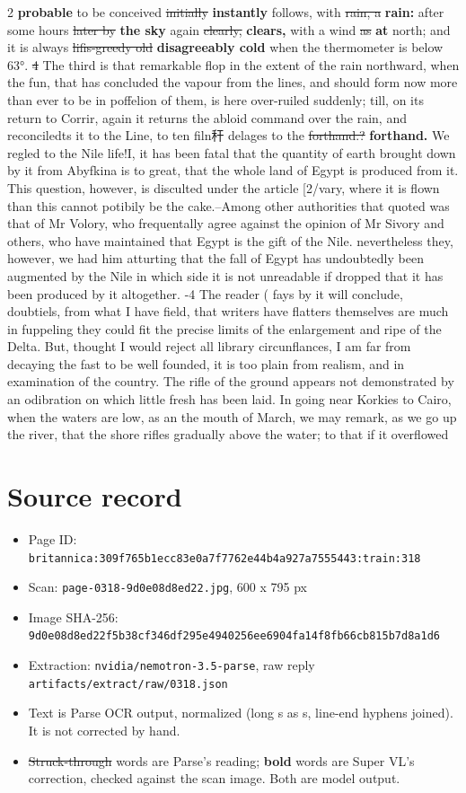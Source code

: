 \documentclass[10pt]{article}
\begin{document}
\begin{multicols}{2}
\textbf{probable} to be conceived \sout{initially} \textbf{instantly} follows, with \sout{rain, a} \textbf{rain:} after some hours \sout{later by} \textbf{the sky} again \sout{clearly,} \textbf{clears,} with a wind \sout{as} \textbf{at} north; and it is always \sout{lifis-greedy old} \textbf{disagreeably cold} when the thermometer is below 63°. \sout{4} The third is that remarkable flop in the extent of the rain northward, when the fun, that has concluded the vapour from the lines, and should form now more than ever to be in poffelion of them, is here over-ruiled suddenly; till, on its return to Corrir, again it returns the abloid command over the rain, and reconciledts it to the Line, to ten filn秆 delages to the \sout{forthand.?} \textbf{forthand.} We regled to the Nile life!I, it has been fatal that the quantity of earth brought down by it from Abyfkina is to great, that the whole land of Egypt is produced from it. This question, however, is disculted under the article [2/vary, where it is flown than this cannot potibily be the cake.--Among other authorities that quoted was that of Mr Volory, who frequentally agree against the opinion of Mr Sivory and others, who have maintained that Egypt is the gift of the Nile. nevertheless they, however, we had him atturting that the fall of Egypt has undoubtedly been augmented by the Nile in which side it is not unreadable if dropped that it has been produced by it altogether. -4 The reader ( fays by it will conclude, doubtiels, from what I have field, that writers have flatters themselves are much in fuppeling they could fit the precise limits of the enlargement and ripe of the Delta. But, thought I would reject all library circunflances, I am far from decaying the fast to be well founded, it is too plain from realism, and in examination of the country. The rifle of the ground appears not demonstrated by an odibration on which little fresh has been laid. In going near Korkies to Cairo, when the waters are low, as an the mouth of March, we may remark, as we go up the river, that the shore rifles gradually above the water; to that if it overflowed
\end{multicols}
\section*{Source record}
\begin{itemize}
\item Page ID: \texttt{britannica:309f765b1ecc83e0a7f7762e44b4a927a7555443:train:318}
\item Scan: \texttt{page-0318-9d0e08d8ed22.jpg}, 600 x 795 px
\item Image SHA-256: \texttt{\small 9d0e08d8ed22f5b38cf346df295e4940256ee6904fa14f8fb66cb815b7d8a1d6}
\item Extraction: \texttt{nvidia/nemotron-3.5-parse}, raw reply \texttt{artifacts/extract/raw/0318.json}
\item Text is Parse OCR output, normalized (long s as s, line-end hyphens joined). It is not corrected by hand.
\item \sout{Struck-through} words are Parse's reading; \textbf{bold} words are Super VL's correction, checked against the scan image. Both are model output.
\end{itemize}
\end{document}
